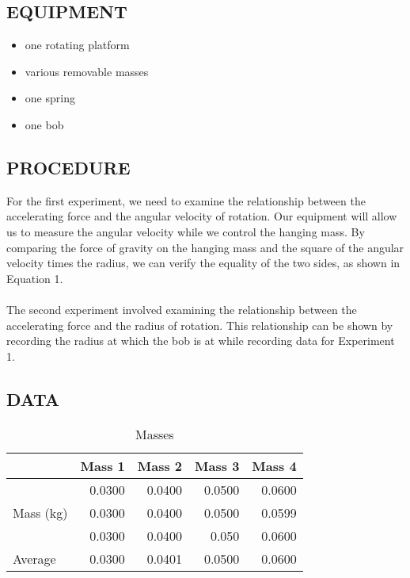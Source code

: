 \documentclass [12pt, letterpaper, twoside] {article}
\begin{document}
\subsection* {EQUIPMENT}
  \noindent
  \begin {itemize}
    \itemsep0em
    \item {one rotating platform}
    \item {various removable masses}
    \item {one spring}
    \item {one bob}
  \end {itemize}

\subsection* {PROCEDURE}
For the first experiment, we need to examine the relationship between the accelerating force and the angular velocity of rotation. Our equipment will allow us to measure the angular velocity while we control the hanging mass. By comparing the force of gravity on the hanging mass and the square of the angular velocity times the radius, we can verify the equality of the two sides, as shown in Equation 1. \\\\
The second experiment involved examining the relationship between the accelerating force and the radius of rotation. This relationship can be shown by recording the radius at which the bob is at while recording data for Experiment 1.

\subsection* {DATA}

\begin {table}[h]
  \centering
  \begin {tabular} {| l | r | r | r | r |}
    \hline\hline
    & Mass 1 & Mass 2 & Mass 3 & Mass 4 \\
    \hline
    \multirow {3}{*}{Mass (kg)} & 0.0300 & 0.0400 & 0.0500 & 0.0600 \\
    & 0.0300 & 0.0400 & 0.0500 & 0.0599 \\
    & 0.0300 & 0.0400 & 0.050 & 0.0600 \\
    \hline
    Average & 0.0300 & 0.0401 & 0.0500 & 0.0600 \\ %
    \hline\hline
  \end {tabular}
  \caption {Masses}
\end {table}
\end{document}
